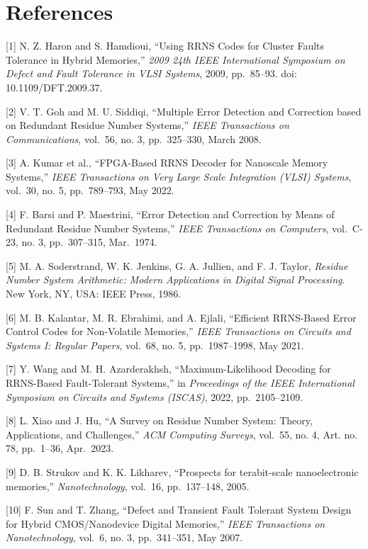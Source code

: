 \documentclass[
  english,
  12pt,
]{report}
\begin{document}
\chapter{References}\label{references}

{[}1{]} N. Z. Haron and S. Hamdioui, ``Using RRNS Codes for Cluster
Faults Tolerance in Hybrid Memories,'' \emph{2009 24th IEEE
International Symposium on Defect and Fault Tolerance in VLSI Systems},
2009, pp.~85--93. doi: 10.1109/DFT.2009.37.

{[}2{]} V. T. Goh and M. U. Siddiqi, ``Multiple Error Detection and
Correction based on Redundant Residue Number Systems,'' \emph{IEEE
Transactions on Communications}, vol.~56, no. 3, pp.~325--330, March
2008.

{[}3{]} A. Kumar et al., ``FPGA-Based RRNS Decoder for Nanoscale Memory
Systems,'' \emph{IEEE Transactions on Very Large Scale Integration
(VLSI) Systems}, vol.~30, no. 5, pp.~789--793, May 2022.

{[}4{]} F. Barsi and P. Maestrini, ``Error Detection and Correction by
Means of Redundant Residue Number Systems,'' \emph{IEEE Transactions on
Computers}, vol.~C-23, no. 3, pp.~307--315, Mar.~1974.

{[}5{]} M. A. Soderstrand, W. K. Jenkins, G. A. Jullien, and F. J.
Taylor, \emph{Residue Number System Arithmetic: Modern Applications in
Digital Signal Processing}. New York, NY, USA: IEEE Press, 1986.

{[}6{]} M. B. Kalantar, M. R. Ebrahimi, and A. Ejlali, ``Efficient
RRNS-Based Error Control Codes for Non-Volatile Memories,'' \emph{IEEE
Transactions on Circuits and Systems I: Regular Papers}, vol.~68, no. 5,
pp.~1987--1998, May 2021.

{[}7{]} Y. Wang and M. H. Azarderakhsh, ``Maximum-Likelihood Decoding
for RRNS-Based Fault-Tolerant Systems,'' in \emph{Proceedings of the
IEEE International Symposium on Circuits and Systems (ISCAS)}, 2022,
pp.~2105--2109.

{[}8{]} L. Xiao and J. Hu, ``A Survey on Residue Number System: Theory,
Applications, and Challenges,'' \emph{ACM Computing Surveys}, vol.~55,
no. 4, Art. no. 78, pp.~1--36, Apr.~2023.

{[}9{]} D. B. Strukov and K. K. Likharev, ``Prospects for terabit-scale
nanoelectronic memories,'' \emph{Nanotechnology}, vol.~16, pp.~137--148,
2005.

{[}10{]} F. Sun and T. Zhang, ``Defect and Transient Fault Tolerant
System Design for Hybrid CMOS/Nanodevice Digital Memories,'' \emph{IEEE
Transactions on Nanotechnology}, vol.~6, no. 3, pp.~341--351, May 2007.
\end{document}

